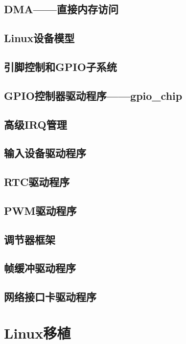 \documentclass[lang=cn,newtx,10pt,scheme=chinese]{elegantbook}
\begin{document}
\chapter{DMA——直接内存访问}

\chapter{Linux设备模型}

\chapter{引脚控制和GPIO子系统}

\chapter{GPIO控制器驱动程序——gpio\_chip}

\chapter{高级IRQ管理}

\chapter{输入设备驱动程序}

\chapter{RTC驱动程序}

\chapter{PWM驱动程序}

\chapter{调节器框架}

\chapter{帧缓冲驱动程序}

\chapter{网络接口卡驱动程序}

\part{Linux移植}
\end{document}
